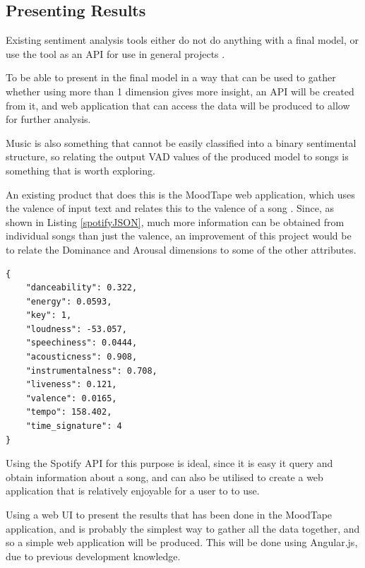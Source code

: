 \subsection{Presenting Results}

Existing sentiment analysis tools either do not do anything with a final model, or use the tool as an API for use in general projects \cite{sentimentAPI}.  

To be able to present in the final model in a way that can be used to gather whether using more than 1 dimension gives more insight, an API will be created from it, and web application that can access the data will be produced to allow for further analysis.

Music is also something  that cannot be easily classified into a binary sentimental structure, so relating the output VAD values of the produced model to songs is something that is worth exploring.

An existing product that does this is the MoodTape web application, which uses the valence of input text and relates this to the valence of a song  \cite{moodtape}. Since, as shown in Listing \ref{spotifyJSON}, much more information can be obtained from individual songs than just the valence, an improvement of this project would be to relate the Dominance and Arousal dimensions to some of the other attributes.

\begin{lstlisting}[style=leftCode, caption={Some of the attributes of a song obtained through requesting information through the Spotify API},captionpos=b, label={spotifyJSON}]
{
    "danceability": 0.322,
    "energy": 0.0593,
    "key": 1,
    "loudness": -53.057,
    "speechiness": 0.0444,
    "acousticness": 0.908,
    "instrumentalness": 0.708,
    "liveness": 0.121,
    "valence": 0.0165,
    "tempo": 158.402,
    "time_signature": 4
}
\end{lstlisting}

Using the Spotify API for this purpose is ideal, since it is easy it query and obtain information about a song, and can also be utilised to create a web application that is relatively enjoyable for a user to to use.

Using a web UI to present the results that has been done in the MoodTape application, and is probably the simplest way to gather all the data together, and so a simple web application will be produced. This will be done using Angular.js, due to previous development knowledge.